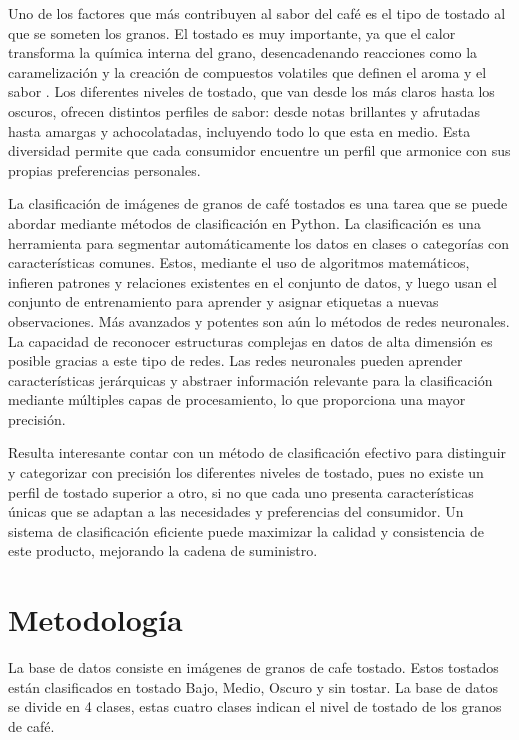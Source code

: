 \documentclass[twocolumn]{article}
\begin{document}
Uno de los factores que más contribuyen al sabor del café es el tipo de tostado al que se someten los granos. El tostado es muy importante, ya que el calor transforma la química interna del grano, desencadenando reacciones como la caramelización y la creación de compuestos volatiles que definen el aroma y el sabor \cite{dos}. Los diferentes niveles de tostado, que van desde los más claros hasta los oscuros, ofrecen distintos perfiles de sabor: desde notas brillantes y afrutadas hasta amargas y achocolatadas, incluyendo todo lo que esta en medio. Esta diversidad permite que cada consumidor encuentre un perfil que armonice con sus propias preferencias personales.

La clasificación de imágenes de granos de café tostados es una tarea que se puede abordar mediante métodos de clasificación en Python. La clasificación es una herramienta para segmentar automáticamente los datos en clases o categorías con características comunes. Estos, mediante el uso de algoritmos matemáticos, infieren patrones y relaciones existentes en el conjunto de datos, y luego usan el conjunto de entrenamiento para aprender y asignar etiquetas a nuevas observaciones. Más avanzados y potentes son aún lo métodos de redes neuronales. La capacidad de reconocer estructuras complejas en datos de alta dimensión es posible gracias a este tipo de redes. Las redes neuronales pueden aprender características jerárquicas y abstraer información relevante para la clasificación mediante múltiples capas de procesamiento, lo que proporciona una mayor precisión.

Resulta interesante contar con un método de clasificación efectivo para distinguir y categorizar con precisión los diferentes niveles de tostado, pues no existe un perfil de tostado superior a otro, si no que cada uno presenta características únicas que se adaptan a las necesidades y preferencias del consumidor. Un sistema de clasificación eficiente puede maximizar la calidad y consistencia de este producto, mejorando la cadena de suministro.


\section{Metodología}
La base de datos consiste en imágenes de granos de cafe tostado. Estos tostados están clasificados en tostado Bajo, Medio, Oscuro y sin tostar. La base de datos se divide en 4 clases, estas cuatro clases indican el nivel de tostado de los granos de café.
\end{document}
